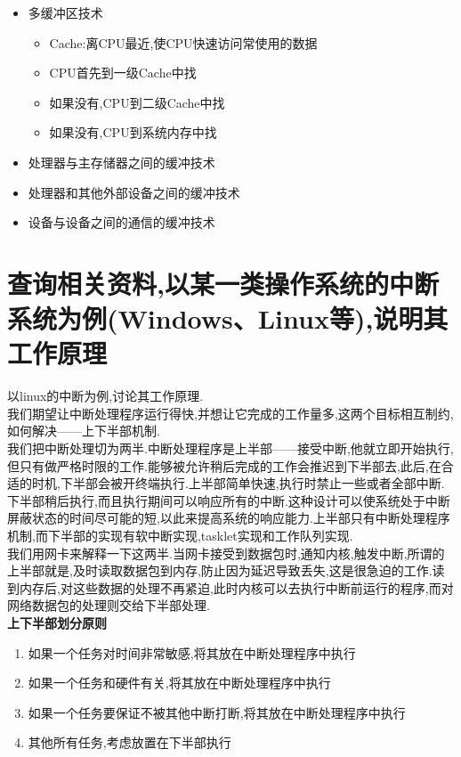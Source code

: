 \documentclass[a4paper,12pt,notitlepage]{article}
\begin{document}
\begin{itemize}
	\item 多缓冲区技术
	\begin{itemize}
		\item Cache:离CPU最近,使CPU快速访问常使用的数据
		\item CPU首先到一级Cache中找
		\item 如果没有,CPU到二级Cache中找
		\item 如果没有,CPU到系统内存中找
	\end{itemize}
	\item 处理器与主存储器之间的缓冲技术
	\item 处理器和其他外部设备之间的缓冲技术
	\item 设备与设备之间的通信的缓冲技术
\end{itemize}

\section{查询相关资料,以某一类操作系统的中断系统为例(Windows、Linux等),说明其工作原理}

	以linux的中断为例,讨论其工作原理. \\
	
	我们期望让中断处理程序运行得快,并想让它完成的工作量多,这两个目标相互制约,如何解决——上下半部机制. \\

	我们把中断处理切为两半.中断处理程序是上半部——接受中断,他就立即开始执行,但只有做严格时限的工作.能够被允许稍后完成的工作会推迟到下半部去,此后,在合适的时机,下半部会被开终端执行.上半部简单快速,执行时禁止一些或者全部中断.下半部稍后执行,而且执行期间可以响应所有的中断.这种设计可以使系统处于中断屏蔽状态的时间尽可能的短,以此来提高系统的响应能力.上半部只有中断处理程序机制,而下半部的实现有软中断实现,tasklet实现和工作队列实现. \\

	我们用网卡来解释一下这两半.当网卡接受到数据包时,通知内核,触发中断,所谓的上半部就是,及时读取数据包到内存,防止因为延迟导致丢失,这是很急迫的工作.读到内存后,对这些数据的处理不再紧迫,此时内核可以去执行中断前运行的程序,而对网络数据包的处理则交给下半部处理. \\

	\textbf{上下半部划分原则} \\
	
\begin{enumerate}
	\item 如果一个任务对时间非常敏感,将其放在中断处理程序中执行
	\item 如果一个任务和硬件有关,将其放在中断处理程序中执行
	\item 如果一个任务要保证不被其他中断打断,将其放在中断处理程序中执行
	\item 其他所有任务,考虑放置在下半部执行
\end{enumerate}
	
\end{document}
